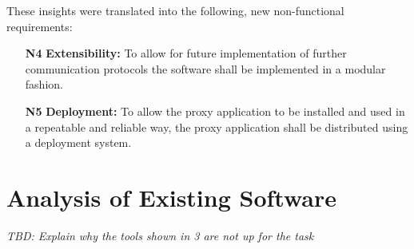 These insights were translated into the following, new non-functional requirements:
\begin{itemize}
    \item [\textbf{N4}] \textbf{Extensibility:} To allow for future implementation of further communication protocols the software shall be implemented in a modular fashion.
    \item [\textbf{N5}] \textbf{Deployment:} To allow the proxy application to be installed and used in a repeatable and reliable way, the proxy application shall be distributed using a deployment system.
\end{itemize}


\section{Analysis of Existing Software}
\label{sec:analysis-existing-software}
\emph{TBD: Explain why the tools shown in 3 are not up for the task}

